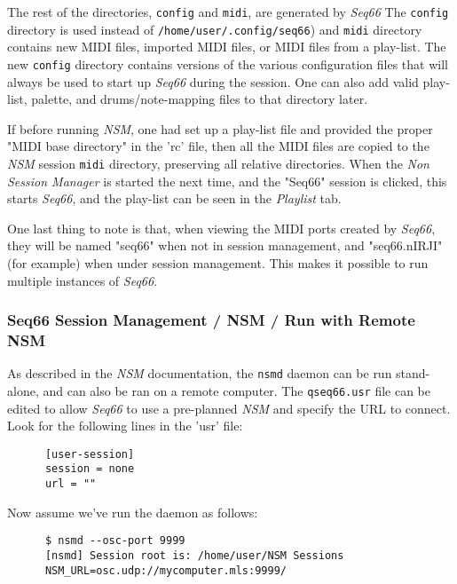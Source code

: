    The rest of the directories,
   \texttt{config} and \texttt{midi},
   are generated by \textsl{Seq66}
   The \texttt{config} directory is used instead of
   \texttt{/home/user/.config/seq66}) and \texttt{midi} directory
   contains new MIDI files, imported MIDI files,
   or MIDI files from a play-list.
   The new \texttt{config} directory
   contains versions of the various configuration files that will always be
   used to start up \textsl{Seq66} during the session.
   One can also add valid play-list, palette, and drums/note-mapping files to
   that directory later.

   If before running \textsl{NSM},
   one had set up a play-list file and provided the proper "MIDI
   base directory" in the 'rc' file, then all the MIDI files are copied to
   the \textsl{NSM} session \texttt{midi} directory,
   preserving all relative directories.
   When the \textsl{Non Session Manager} is started the next time, and the
   "Seq66" session is clicked, this starts \textsl{Seq66}, and the play-list can
   be seen in the \textsl{Playlist} tab.

   One last thing to note is that, when viewing the MIDI ports created by
   \textsl{Seq66}, they will be named "seq66" when not in session management,
   and "seq66.nIRJI" (for example) when under session management.  This makes
   it possible to run multiple instances of \textsl{Seq66}.

\subsubsection{Seq66 Session Management / NSM / Run with Remote NSM}
\label{subsec:sessions_nsm_before_using_nsm}

   As described in the \textsl{NSM} documentation, the \texttt{nsmd} daemon can
   be run stand-alone, and can also be ran on a remote computer.
   The \texttt{qseq66.usr} file can be edited to allow \textsl{Seq66} to
   use a pre-planned \textsl{NSM} and specify the URL to connect.
   Look for the following lines in the 'usr' file:

   \begin{verbatim}
      [user-session]
      session = none
      url = ""
   \end{verbatim}

   Now assume we've run the daemon as follows:

   \begin{verbatim}
      $ nsmd --osc-port 9999
      [nsmd] Session root is: /home/user/NSM Sessions
      NSM_URL=osc.udp://mycomputer.mls:9999/
   \end{verbatim}

